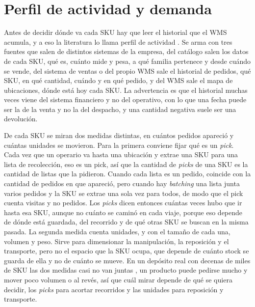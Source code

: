 \section{Perfil de actividad y demanda}
\label{sec:perfil}

Antes de decidir dónde va cada SKU hay que leer el historial que el WMS acumula, y a eso la literatura lo llama perfil de actividad \citep[capítulo~14]{bartholdi2014warehouse}.
Se arma con tres fuentes que salen de distintos sistemas de la empresa, del catálogo salen los datos de cada SKU, qué es, cuánto mide y pesa, a qué familia pertenece y desde cuándo se vende, del sistema de ventas o del propio WMS sale el historial de pedidos, qué SKU, en qué cantidad, cuándo y en qué pedido, y del WMS sale el mapa de ubicaciones, dónde está hoy cada SKU.
La advertencia es que el historial muchas veces viene del sistema financiero y no del operativo, con lo que una fecha puede ser la de la venta y no la del despacho, y una cantidad negativa suele ser una devolución.

De cada SKU se miran dos medidas distintas, en cuántos pedidos apareció y cuántas unidades se movieron.
Para la primera conviene fijar qué es un \emph{pick}.
Cada vez que un operario va hasta una ubicación y extrae una SKU para una lista de recolección, eso es un pick, así que la cantidad de \emph{picks} de una SKU es la cantidad de listas que la pidieron.
Cuando cada lista es un pedido, coincide con la cantidad de pedidos en que apareció, pero cuando hay \emph{batching} una lista junta varios pedidos y la SKU se extrae una sola vez para todos, de modo que el pick cuenta visitas y no pedidos.
Los \emph{picks} dicen entonces cuántas veces hubo que ir hasta esa SKU, aunque no cuánto se caminó en cada viaje, porque eso depende de dónde está guardada, del recorrido y de qué otras SKU se buscan en la misma pasada.
La segunda medida cuenta unidades, y con el tamaño de cada una, volumen y peso.
Sirve para dimensionar la manipulación, la reposición y el transporte, pero no el espacio que la SKU ocupa, que depende de cuánto stock se guarda de ella y no de cuánto se mueve.
En un depósito real con decenas de miles de SKU las dos medidas casi no van juntas \citep[sección~2.3]{bartholdi2014warehouse}, un producto puede pedirse mucho y mover poco volumen o al revés, así que cuál mirar depende de qué se quiera decidir, los \emph{picks} para acortar recorridos y las unidades para reposición y transporte.

